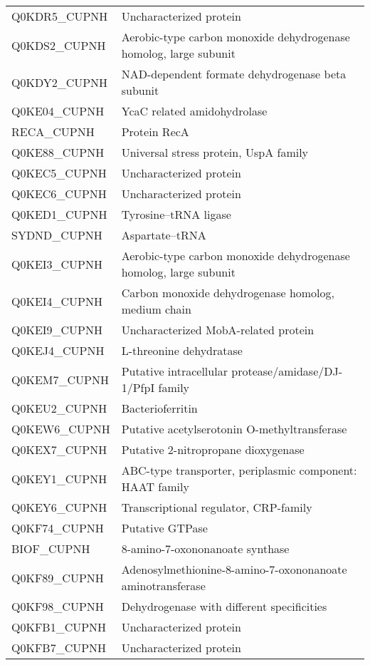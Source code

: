 \begin{center}
\begin{longtable}{ l l }
Q0KDR5\_CUPNH & Uncharacterized protein \\ [0.5ex]
Q0KDS2\_CUPNH & Aerobic-type carbon monoxide dehydrogenase homolog, large subunit \\ [0.5ex]
Q0KDY2\_CUPNH & NAD-dependent formate dehydrogenase beta subunit \\ [0.5ex]
Q0KE04\_CUPNH & YcaC related amidohydrolase \\ [0.5ex]
RECA\_CUPNH & Protein RecA \\ [0.5ex]
Q0KE88\_CUPNH & Universal stress protein, UspA family \\ [0.5ex]
Q0KEC5\_CUPNH & Uncharacterized protein \\ [0.5ex]
Q0KEC6\_CUPNH & Uncharacterized protein \\ [0.5ex]
Q0KED1\_CUPNH & Tyrosine--tRNA ligase \\ [0.5ex]
SYDND\_CUPNH & Aspartate--tRNA \\ [0.5ex]
Q0KEI3\_CUPNH & Aerobic-type carbon monoxide dehydrogenase homolog, large subunit \\ [0.5ex]
Q0KEI4\_CUPNH & Carbon monoxide dehydrogenase homolog, medium chain \\ [0.5ex]
Q0KEI9\_CUPNH & Uncharacterized MobA-related protein \\ [0.5ex]
Q0KEJ4\_CUPNH & L-threonine dehydratase \\ [0.5ex]
Q0KEM7\_CUPNH & Putative intracellular protease/amidase/DJ-1/PfpI family \\ [0.5ex]
Q0KEU2\_CUPNH & Bacterioferritin \\ [0.5ex]
Q0KEW6\_CUPNH & Putative acetylserotonin O-methyltransferase \\ [0.5ex]
Q0KEX7\_CUPNH & Putative 2-nitropropane dioxygenase \\ [0.5ex]
Q0KEY1\_CUPNH & ABC-type transporter, periplasmic component: HAAT family \\ [0.5ex]
Q0KEY6\_CUPNH & Transcriptional regulator, CRP-family \\ [0.5ex]
Q0KF74\_CUPNH & Putative GTPase \\ [0.5ex]
BIOF\_CUPNH & 8-amino-7-oxononanoate synthase \\ [0.5ex]
Q0KF89\_CUPNH & Adenosylmethionine-8-amino-7-oxononanoate aminotransferase \\ [0.5ex]
Q0KF98\_CUPNH & Dehydrogenase with different specificities \\ [0.5ex]
Q0KFB1\_CUPNH & Uncharacterized protein \\ [0.5ex]
Q0KFB7\_CUPNH & Uncharacterized protein \\ [0.5ex]

\end{longtable}
\end{center}

